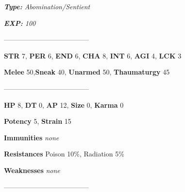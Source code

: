 \documentclass[11pt,a4paper,twocolumn]{book}
\begin{document}
	\noindent
	\emph{\textbf{Type:} Abomination/Sentient}
	
	\noindent
	\emph{\textbf{EXP:} 100}
%	
%		
%	
%		

--------------------------------------

\noindent
\textbf{STR} 7, \textbf{PER} 6, \textbf{END} 6, \textbf{CHA} 8, \textbf{INT} 6, \textbf{AGI} 4, \textbf{LCK} 3

\noindent
\textbf{Melee} 50,\textbf{Sneak} 40, \textbf{Unarmed} 50, \textbf{Thaumaturgy} 45	 

--------------------------------------

\noindent
\textbf{HP} 8, \textbf{DT} 0, \textbf{AP} 12, \textbf{Size} 0, \textbf{Karma} 0

\noindent
\textbf{Potency} 5, \textbf{Strain} 15

\noindent
\textbf{Immunities} \emph{none} %

\noindent
\textbf{Resistances} Poison 10\%, Radiation 5\%%

\noindent
\textbf{Weaknesses} \emph{none}%

--------------------------------------	
	
\end{document}
